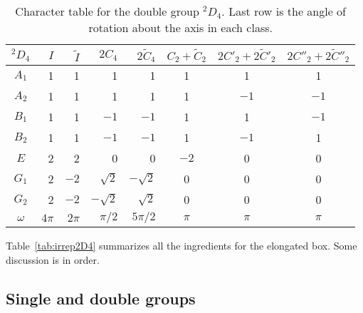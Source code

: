 \documentclass[aps,prd,reprint,showpacs,floatfix,longbibliography,,superscriptaddress]{revtex4-1}
\begin{document}
\begin{widetext}
%
\begin{table}
\begin{tabular}{c| r r r  r c c c}\toprule
$^2D_4$  & $I$  & $\widetilde{I}$ &  $2C_4$   &  $2\widetilde{C}_4$  &  $C_2+\widetilde{C}_2$   &  $2C'_2+2\widetilde{C}'_2$ & $2C''_2+2\widetilde{C}''_2$   \\
\hline
$A_{1}$  &  1  & 1       & 1                 & 1                 & 1       & 1              &   1                 \\
$A_{2}$  &  1  & 1       & 1                 & 1                 & 1       & $-1$         &  $-1$           \\
$B_1$    &  1  & 1       & $-1$            & $-1$            & 1       &  1             & $-1$            \\
$B_2$    &  1  & 1       & $-1$            & $-1$            & 1       & $-1$         & 1                \\
$ E  $     &  2  & 2       & 0                 & 0                 & $-2$  & 0              &  0             \\
\hline
$G_1$   &  2  & $-2$   & $\sqrt{2}$   &  $-\sqrt{2}$  &   0    & 0               & 0        \\
$G_2$   &  2  & $-2$   & $-\sqrt{2}$  &  $\sqrt{2}$   &   0    & 0               & 0         \\
\hline
$\omega$ & $4\pi$  &  $2\pi$  & $\pi/2$  & $5\pi/2$  & $\pi$ &  $\pi$  &   $\pi$  \\
\bottomrule
\end{tabular}
\caption{Character table for the double group $^2D_4$. Last row is the angle of rotation about the axis in each class.}
\label{tab:char2D4}
\end{table}
%



Table~\ref{tab:irrep2D4} summarizes all the ingredients for the elongated box.
Some discussion is in order.

\subsection{Single and double groups}


\end{widetext}
\end{document}
